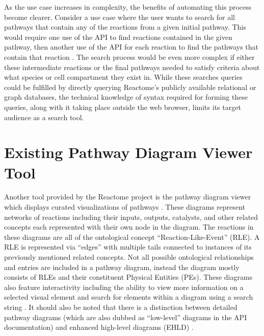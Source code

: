 \documentclass[12pt]{report}
\begin{document}
As the use case increases in complexity, the benefits of automating this process become clearer. Consider a use case where the user wants to search for all pathways that contain any of the reactions from a given initial pathway. This would require one use of the API to find reactions contained in the given pathway, then another use of the API for each reaction to find the pathways that contain that reaction \cite {ContentServiceAPIDocumentation}. The search process would be even more complex if either these intermediate reactions or the final pathways needed to satisfy criteria about what species or cell compartment they exist in. While these searches queries could be fulfilled by directly querying Reactome's publicly available relational or graph databases, the technical knowledge of syntax required for forming these queries, along with it taking place outside the web browser, limits its target audience as a search tool.

\section{Existing Pathway Diagram Viewer Tool}
Another tool provided by the Reactome project is the pathway diagram viewer which displays curated visualizations of pathways \cite{PathwayDiagramsSpecifications}. These diagrams represent networks of reactions including their inputs, outputs, catalysts, and other related concepts each represented with their own node in the diagram. The reactions in these diagrams are all of the ontological concept ``Reaction-Like-Event'' (RLE). A RLE is represented via ``edges'' with multiple tails connected to instances of its previously mentioned related concepts. Not all possible ontological relationships and entries are included in a pathway diagram, instead the diagram mostly consists of RLEs and their constituent Physical Entities (PEs). These diagrams also feature interactivity including the ability to view more information on a selected visual element and search for elements within a diagram using a search string \cite {FabregatAntonio2018RgdE}. It should also be noted that there is a distinction between detailed pathway diagrams (which are also dubbed as ``low-level'' diagrams in the API documentation) and enhanced high-level diagrams (EHLD) \cite{ThePathwayBrowserGeneralDescription, ContentServiceAPIDocumentation}.
\end{document}
